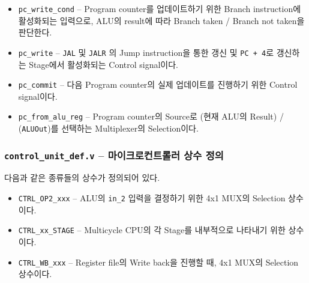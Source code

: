 \documentclass{scrartcl}
\begin{document}
\begin{itemize}
  \item \texttt{pc\_write\_cond} -- Program counter를 업데이트하기 위한 Branch instruction에 활성화되는 입력으로, ALU의 result에 따라 Branch taken / Branch not taken을 판단한다.
  \item \texttt{pc\_write} -- \texttt{JAL} 및 \texttt{JALR} 의 Jump instruction을 통한 갱신 및 \texttt{PC + 4}로 갱신하는 Stage에서 활성화되는 Control signal이다.
  \item \texttt{pc\_commit} -- 다음 Program counter의 실제 업데이트를 진행하기 위한 Control signal이다.
  \item \texttt{pc\_from\_alu\_reg} -- Program counter의 Source로 (현재 ALU의 Result) / (\texttt{ALUOut})를 선택하는 Multiplexer의 Selection이다.
\end{itemize}
\subsubsection{\texttt{control\_unit\_def.v} -- 마이크로컨트롤러 상수 정의}
다음과 같은 종류들의 상수가 정의되어 있다.
\begin{itemize}
  \item \texttt{CTRL\_OP2\_xxx} -- ALU의 \texttt{in\_2} 입력을 결정하기 위한 4x1 MUX의 Selection 상수이다.
  \item \texttt{CTRL\_xx\_STAGE} -- Multicycle CPU의 각 Stage를 내부적으로 나타내기 위한 상수이다.
  \item \texttt{CTRL\_WB\_xxx} -- Register file의 Write back을 진행할 때, 4x1 MUX의 Selection 상수이다.
\end{itemize}
\end{document}
